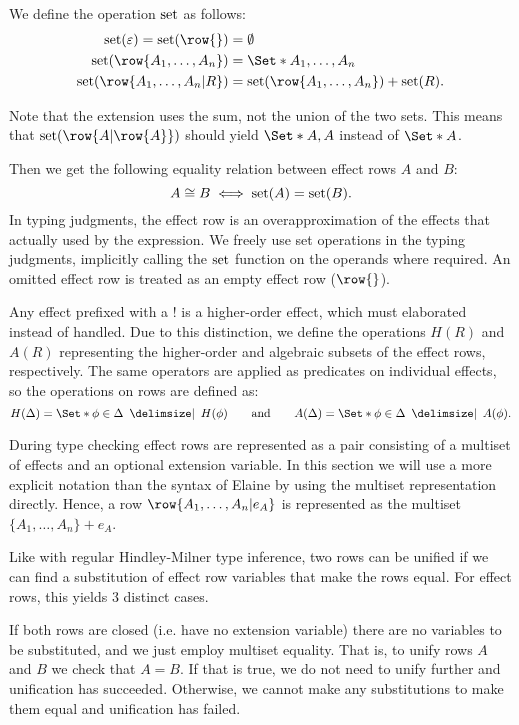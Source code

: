 We define the operation $\operatorname{set}$ as follows:
\begin{align*}
    \set(\varepsilon) = \set(\row{}) &= \emptyset\\
    \set(\row{A_1, \dots, A_n}) &= \S{A_1, \dots, A_n}\\
    \set(\row{A_1, \dots, A_n|R}) &= \set(\row{A_1, \dots, A_n}) + \set(R).
\end{align*}

Note that the extension uses the sum, not the union of the two sets. This means that $\set(\row{A | \row{A}})$ should yield $\S{A, A}$ instead of $\S{A}$.

Then we get the following equality relation between effect rows $A$ and $B$:
\[ A \cong B \iff \operatorname{set}(A) = \operatorname{set}(B). \]
In typing judgments, the effect row is an overapproximation of the effects that actually used by the expression. We freely use set operations in the typing judgments, implicitly calling the $\operatorname{set}$ function on the operands where required. An omitted effect row is treated as an empty effect row ($\row{}$).

Any effect prefixed with a $!$ is a higher-order effect, which must elaborated instead of handled. Due to this distinction, we define the operations $H(R)$ and $A(R)$ representing the higher-order and algebraic subsets of the effect rows, respectively. The same operators are applied as predicates on individual effects, so the operations on rows are defined as:
\[ 
    H(\Delta) = \S{ \phi \in \Delta \given H(\phi) }
    \qquad
    \text{and}
    \qquad
    A(\Delta) = \S{ \phi \in \Delta \given A(\phi) }.
\]

During type checking effect rows are represented as a pair consisting of a multiset of effects and an optional extension variable. In this section we will use a more explicit notation than the syntax of Elaine by using the multiset representation directly. Hence, a row $\row{A_1,\dots,A_n|e_A}$ is represented as the multiset $\{A_1,\dots,A_n\} + e_A$.

Like with regular Hindley-Milner type inference, two rows can be unified if we can find a substitution of effect row variables that make the rows equal. For effect rows, this yields 3 distinct cases.

If both rows are closed (i.e. have no extension variable) there are no variables to be substituted, and we just employ multiset equality. That is, to unify rows $A$ and $B$ we check that $A = B$. If that is true, we do not need to unify further and unification has succeeded. Otherwise, we cannot make any substitutions to make them equal and unification has failed.

